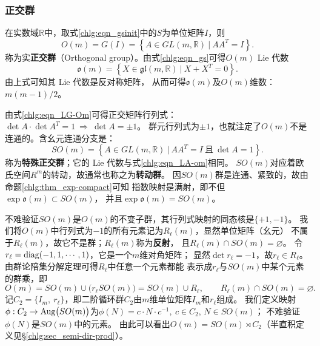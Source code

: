 

\subsubsection{正交群}\label{chlg:sec_Orthogonal}
在实数域$\mathbb{R}$中，取式\eqref{chlg:eqn_gsinit}中的$S$为单位矩阵$I$，则
\begin{equation}\label{chlg:eqn_LG-Om}
    O(m) = G(I)= \left\{ A \in GL(m,\mathbb{R})\ |\ A A^T =I \right\}.
\end{equation}
称为实\textbf{正交群}（Orthogonal group）。由式\eqref{chlg:eqn_gs}可得$O(m)$ Lie 代数
\begin{equation}\label{chlg:eqn_LA-om}
    \mathfrak{o}(m) = \left\{ X \in \mathfrak{gl}(m,\mathbb{R}) \ | \ 
    X  +  X^T = 0 \right\} .
\end{equation}
由上式可知其 Lie 代数是反对称矩阵，
从而可得$\mathfrak{o}(m)$及$O(m)$维数：$m(m-1)/2$。

由式\eqref{chlg:eqn_LG-Om}可得正交矩阵行列式：
$\det A \cdot \det A^T = 1 \ \Rightarrow \ \det A = \pm 1$。
群元行列式为$\pm 1$，也就注定了$O(m)$不是连通的。含幺元连通分支是：
\begin{equation}\label{chlg:eqn_LG-so}
    SO(m) %
    = \left\{ A \in GL(m,\mathbb{R})\ |\ A A^T =I 
    \ \text{且}\ \det A = 1 \right\} .
\end{equation}
称为\textbf{特殊正交群}；它的 Lie 代数与式\eqref{chlg:eqn_LA-om}相同。
$SO(m)$对应着欧氏空间$R^m$的转动，故通常也称之为\textbf{转动群}。
因$SO(m)$群是连通、紧致的，故由命题\ref{chlg:thm_exp-compact}可知
指数映射是满射，即不但$\exp \mathfrak{o}(m) \subset SO(m)$，
并且$\exp \mathfrak{o}(m) = SO(m)$。






不难验证$SO(m)$是$O(m)$的不变子群，其行列式映射的同态核是$\{+1,-1\}$。
我们将$O(m)$中行列式为$-1$的所有元素记为$R_{\ell}(m)$，显然单位矩阵（幺元）
不属于$R_{\ell}(m)$，故它不是群；$R_{\ell}(m)$称为\textbf{反射}，
且$R_{\ell}(m)\cap SO(m)=\varnothing$。
令$r_{\ell}={\rm diag}(-1,1,\cdots,1)$，它是一个$m$维对角矩阵；
显然$\det r_{\ell} = -1$，故$r_{\ell}\in R_{\ell}$。
由群论陪集分解定理可得$R_{\ell}$中任意一个元素都能
表示成$r_{\ell}$与$SO(m)$中某个元素的群乘，即
\begin{equation*}
    O(m)= SO(m)\cup \bigl(r_{\ell}SO(m)\bigr)= SO(m) \cup R_{\ell},
    \qquad R_{\ell}(m)\cap SO(m)=\varnothing . 
\end{equation*}
记$C_2=\{I_m,\ r_{\ell}\}$，即二阶循环群$C_2$由$m$维单位矩阵$I_m$和$r_{\ell}$组成。
我们定义映射$\phi:C_2 \to {\rm Aug}\bigl(SO(m)\bigr)$为$\phi(N)=c\cdot N \cdot c^{-1},
\  c\in C_2, \, N\in SO(m)$；
不难验证$\phi(N)$是$SO(m)$中的元素。
由此可以看出$O(m)=SO(m)\rtimes C_2$（半直积定义见\S\ref{chlg:sec_semi-dir-prod}）。


